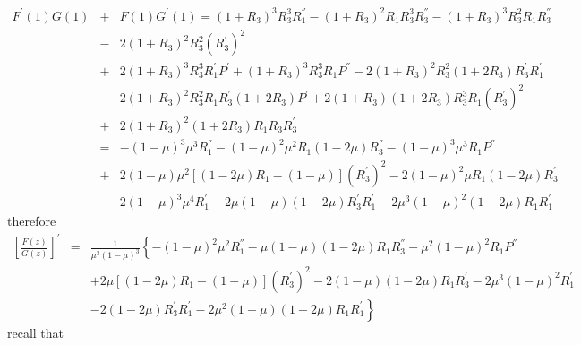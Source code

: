 \documentclass{article}
\begin{document}
\begin{eqnarray*}
F^{'}\left(1\right)G\left(1\right)&+&F\left(1\right)G^{'}\left(1\right)
=\left(1+R_{3}\right)^{3}R_{3}^{3}R_{1}^{''}-\left(1+R_{3}\right)^{2}R_{1}R_{3}^{3}R_{3}^{''}
-\left(1+R_{3}\right)^{3}R_{3}^{2}R_{1}R_{3}^{''}\\
&-&2\left(1+R_{3}\right)^{2}R_{3}^{2}
\left(R_{3}^{'}\right)^{2}\\
&+&2\left(1+R_{3}\right)^{3}R_{3}^{3}R_{1}^{'}P^{'}
+\left(1+R_{3}\right)^{3}R_{3}^{3}R_{1}P^{''}
-2\left(1+R_{3}\right)^{2}R_{3}^{2}\left(1+2R_{3}\right)R_{3}^{'}R_{1}^{'}\\
&-&2\left(1+R_{3}\right)^{2}R_{3}^{2}R_{1}R_{3}^{'}\left(1+2R_{3}\right)P^{'}
+2\left(1+R_{3}\right)\left(1+2R_{3}\right)R_{3}^{3}R_{1}\left(R_{3}^{'}\right)^{2}\\
&+&2\left(1+R_{3}\right)^{2}\left(1+2R_{3}\right)R_{1}R_{3}R_{3}^{'}\\
&=&-\left(1-\mu\right)^{3}\mu^{3}R_{1}^{''}-\left(1-\mu\right)^{2}\mu^{2}R_{1}\left(1-2\mu\right)R_{3}^{''}
-\left(1-\mu\right)^{3}\mu^{3}R_{1}P^{''}\\
&+&2\left(1-\mu\right)\mu^{2}\left[\left(1-2\mu\right)R_{1}-\left(1-\mu\right)\right]\left(R_{3}^{'}\right)^{2}
-2\left(1-\mu\right)^{2}\mu R_{1}\left(1-2\mu\right)R_{3}^{'}\\
&-&2\left(1-\mu\right)^{3}\mu^{4}R_{1}^{'}-2\mu\left(1-\mu\right)\left(1-2\mu\right)R_{3}^{'}R_{1}^{'}
-2\mu^{3}\left(1-\mu\right)^{2}\left(1-2\mu\right)R_{1}R_{1}^{'}
\end{eqnarray*}
therefore
\begin{eqnarray*}
\left[\frac{F\left(z\right)}{G\left(z\right)}\right]^{'}&=&\frac{1}{\mu^{3}\left(1-\mu\right)^{3}}\left\{
-\left(1-\mu\right)^{2}\mu^{2}R_{1}^{''}-\mu\left(1-\mu\right)\left(1-2\mu\right)R_{1}R_{3}^{''}
-\mu^{2}\left(1-\mu\right)^{2}R_{1}P^{''}\right.\\
&&\left.+2\mu\left[\left(1-2\mu\right)R_{1}-\left(1-\mu\right)\right]\left(R_{3}^{'}\right)^{2}
-2\left(1-\mu\right)\left(1-2\mu\right)R_{1}R_{3}^{'}-2\mu^{3}\left(1-\mu\right)^{2}R_{1}^{'}\right.\\
&&\left.-2\left(1-2\mu\right)R_{3}^{'}R_{1}^{'}-2\mu^{2}\left(1-\mu\right)\left(1-2\mu\right)R_{1}R_{1}^{'}\right\}
\end{eqnarray*}
recall that
\end{document}
